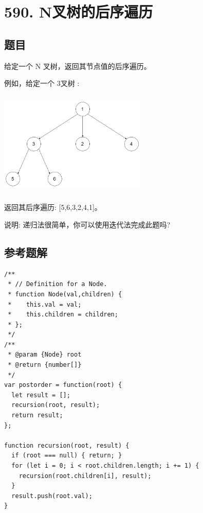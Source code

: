 \newpage
\section{590. N叉树的后序遍历}
\label{leetcode:590}

\subsection{题目}

给定一个 N 叉树，返回其节点值的后序遍历。

例如，给定一个 3叉树 :

\includegraphics[width=70mm,height=50mm]{images/leetcode/leetcode_429_narytreeexample.png}

返回其后序遍历: [5,6,3,2,4,1]。

说明: 递归法很简单，你可以使用迭代法完成此题吗?

\subsection{参考题解}

\begin{verbatim}
/**
 * // Definition for a Node.
 * function Node(val,children) {
 *    this.val = val;
 *    this.children = children;
 * };
 */
/**
 * @param {Node} root
 * @return {number[]}
 */
var postorder = function(root) {
  let result = [];
  recursion(root, result);
  return result;
};

function recursion(root, result) {
  if (root === null) { return; }
  for (let i = 0; i < root.children.length; i += 1) {
    recursion(root.children[i], result);
  }
  result.push(root.val);
}
\end{verbatim}